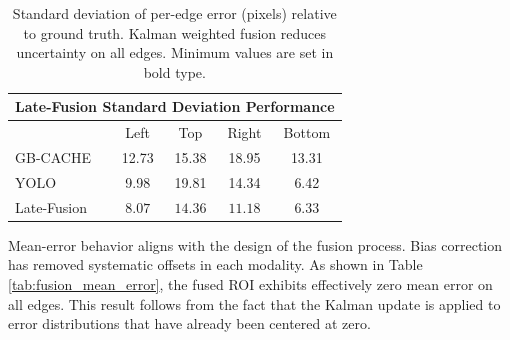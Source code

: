 \documentclass{erauthesis}
\begin{document}
\begin{table}[htpb]
\centering
\begin{tabular}{lcccc}
\hline
\multicolumn{5}{c}{Late-Fusion Standard Deviation Performance}\\
\hline
\hline
            & Left  & Top   & Right & Bottom \\
GB-CACHE    & 12.73  & 15.38 & 18.95 & 13.31   \\
YOLO        & 9.98 & 19.81  & 14.34  & 6.42   \\
Late-Fusion & $\mathbf{8.07}$ & $\mathbf{14.36}$  & $\mathbf{11.18}$ & $\mathbf{6.33}$  \\
\hline
\end{tabular}
\caption{Standard deviation of per-edge error (pixels) relative to ground truth. Kalman weighted fusion reduces uncertainty on all edges. Minimum values are set in bold type.}
\label{tab:fusion_std}
\end{table}

Mean-error behavior aligns with the design of the fusion process. Bias correction has removed systematic offsets in each modality. As shown in Table \ref{tab:fusion_mean_error}, the fused ROI exhibits effectively zero mean error on all edges. This result follows from the fact that the Kalman update is applied to error distributions that have already been centered at zero.


\end{document}
